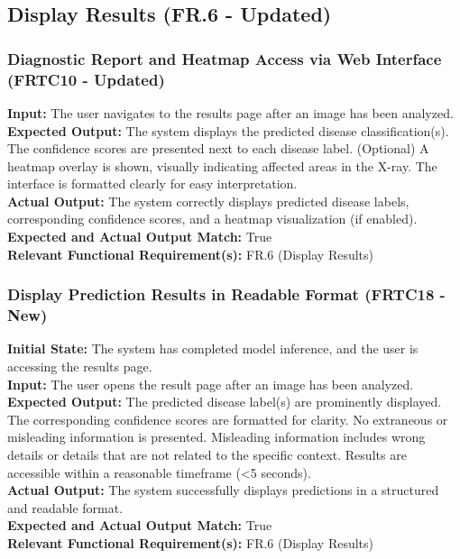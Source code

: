 \documentclass[12pt, titlepage]{article}
\begin{document}
\subsection{Display Results (FR.6 - Updated)}
\subsubsection{Diagnostic Report and Heatmap Access via Web Interface (FRTC10 - Updated)}
\textbf{Input:} The user navigates to the results page after an image has been analyzed.\\
\textbf{Expected Output:} The system displays the predicted disease classification(s). The confidence scores are presented next to each disease label. (Optional) A heatmap overlay is shown, visually indicating affected areas in the X-ray. The interface is formatted clearly for easy interpretation.\\
\textbf{Actual Output:} The system correctly displays predicted disease labels, corresponding confidence scores, and a heatmap visualization (if enabled).\\
\textbf{Expected and Actual Output Match:} True\\
\textbf{Relevant Functional Requirement(s):} FR.6 (Display Results)\\

\subsubsection{Display Prediction Results in Readable Format (FRTC18 - New)}
\textbf{Initial State:} The system has completed model inference, and the user is accessing the results page.\\
\textbf{Input:} The user opens the result page after an image has been analyzed.\\
\textbf{Expected Output:} The predicted disease label(s) are prominently displayed. The corresponding confidence scores are formatted for clarity. No extraneous or misleading information is presented. Misleading information includes wrong details or details that are not related to the specific context. Results are accessible within a reasonable timeframe (<5 seconds).\\
\textbf{Actual Output:} The system successfully displays predictions in a structured and readable format.\\
\textbf{Expected and Actual Output Match:} True\\
\textbf{Relevant Functional Requirement(s):} FR.6 (Display Results)\\
\end{document}
